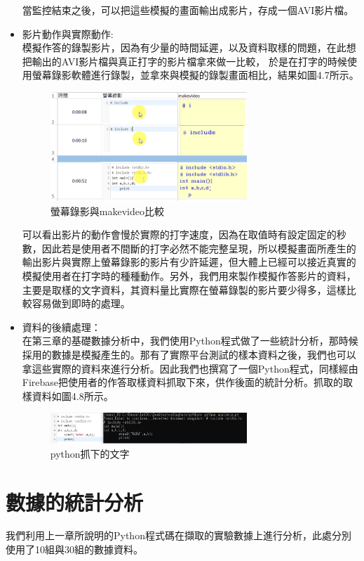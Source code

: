 \begin{itemize}
	當監控結束之後，可以把這些模擬的畫面輸出成影片，存成一個AVI影片檔。
	
	\item 影片動作與實際動作:\\
	模擬作答的錄製影片，因為有少量的時間延遲，以及資料取樣的問題，在此想把輸出的AVI影片檔與真正打字的影片檔拿來做一比較，
	於是在打字的時候使用螢幕錄影軟體進行錄製，並拿來與模擬的錄製畫面相比，結果如圖4.7所示。\\
			\begin{figure}[H] 
		\centering 
		\includegraphics[width=0.7\textwidth]{diff.png}
		\caption{螢幕錄影與makevideo比較} 
		\label{Fig.4.4.3} 
		\end{figure}
	可以看出影片的動作會慢於實際的打字速度，因為在取值時有設定固定的秒數，因此若是使用者不間斷的打字必然不能完整呈現，所以模擬畫面所產生的輸出影片與實際上螢幕錄影的影片有少許延遲，但大體上已經可以接近真實的模擬使用者在打字時的種種動作。另外，我們用來製作模擬作答影片的資料，主要是取樣的文字資料，其資料量比實際在螢幕錄製的影片要少得多，這樣比較容易做到即時的處理。

	\item 資料的後續處理：\\
	在第三章的基礎數據分析中，我們使用Python程式做了一些統計分析，那時候採用的數據是模擬產生的。那有了實際平台測試的樣本資料之後，我們也可以拿這些實際的資料來進行分析。因此我們也撰寫了一個Python程式，同樣經由Firebase把使用者的作答取樣資料抓取下來，供作後面的統計分析。抓取的取樣資料如圖4.8所示。
	\begin{figure}[H] 
		\centering 
		\includegraphics[width=0.7\textwidth]{anysis.png}
		\caption{python抓下的文字} 
		\label{Fig.4.4.4} 
	\end{figure}
\end{itemize}

\section{數據的統計分析}
我們利用上一章所說明的Python程式碼在擷取的實驗數據上進行分析，此處分別使用了10組與30組的數據資料。
